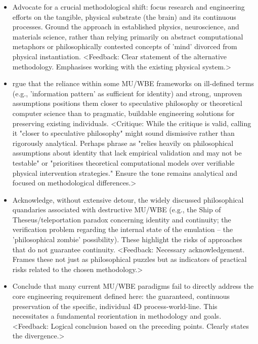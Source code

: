 \documentclass[10pt]{article}
\begin{document}
\begin{sloppypar}
\begin{itemize}
    \item Advocate for a crucial methodological shift: focus research and engineering efforts on the tangible, physical substrate (the brain) and its continuous processes. Ground the approach in established physics, neuroscience, and materials science, rather than relying primarily on abstract computational metaphors or philosophically contested concepts of 'mind' divorced from physical instantiation. <Feedback: Clear statement of the alternative methodology. Emphasises working with the existing physical system.>

    \item rgue that the reliance within some MU/WBE frameworks on ill-defined terms (e.g., 'information pattern' as sufficient for identity) and strong, unproven assumptions positions them closer to speculative philosophy or theoretical computer science than to pragmatic, buildable engineering solutions for preserving existing individuals. <Critique: While the critique is valid, calling it "closer to speculative philosophy" might sound dismissive rather than rigorously analytical. Perhaps phrase as "relies heavily on philosophical assumptions about identity that lack empirical validation and may not be testable" or "prioritises theoretical computational models over verifiable physical intervention strategies." Ensure the tone remains analytical and focused on methodological differences.>

    \item Acknowledge, without extensive detour, the widely discussed philosophical quandaries associated with destructive MU/WBE (e.g., the Ship of Theseus/teleportation paradox concerning identity and continuity; the verification problem regarding the internal state of the emulation – the 'philosophical zombie' possibility). These highlight the risks of approaches that do not guarantee continuity. <Feedback: Necessary acknowledgement. Frames these not just as philosophical puzzles but as indicators of practical risks related to the chosen methodology.>

    \item Conclude that many current MU/WBE paradigms fail to directly address the core engineering requirement defined here: the guaranteed, continuous preservation of the specific, individual 4D process-world-line. This necessitates a fundamental reorientation in methodology and goals. <Feedback: Logical conclusion based on the preceding points. Clearly states the divergence.>
  \end{itemize}


\end{sloppypar}
\end{document}
